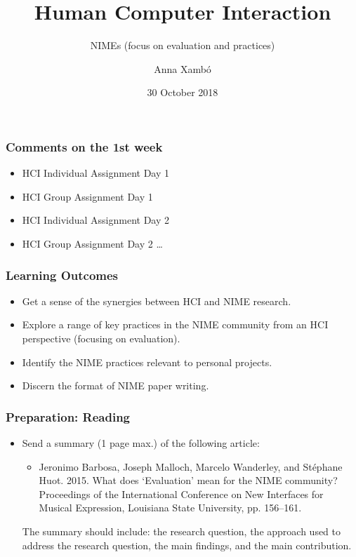 \documentclass[screen, aspectratio=169]{beamer}
\title[HCI-intro]{Human Computer Interaction}
\subtitle{NIMEs (focus on evaluation and practices)}
\author[A. Xamb{\'o}]{Anna Xamb{\'o}}
\institute[NTNU]{Department of Music, NTNU}
\date{30 October 2018}
\begin{document}
\begin{frame}
  \titlepage
\end{frame}

\begin{frame}
\frametitle{Comments on the 1st week}
\begin{itemize}
\item HCI Individual Assignment Day 1
\item HCI Group Assignment Day 1
\item HCI Individual Assignment Day 2
\item HCI Group Assignment Day 2 \dots
\end{itemize}
\end{frame}
%
\begin{frame}
\frametitle{Learning Outcomes}
\begin{itemize}
\item Get a sense of the synergies between HCI and NIME research.
\item Explore a range of key practices in the NIME community from an HCI perspective (focusing on evaluation).
\item Identify the NIME practices relevant to personal projects.
\item Discern the format of NIME paper writing.
\end{itemize}
\end{frame}
%
\begin{frame}
\frametitle{Preparation: Reading}
\begin{itemize}
\item Send a summary (1 page max.) of the following article:
\begin{itemize}
\item Jeronimo Barbosa, Joseph Malloch, Marcelo Wanderley, and St\'{e}phane Huot. 2015. What does `Evaluation' mean for the NIME community? Proceedings of the International Conference on New Interfaces for Musical Expression, Louisiana State University, pp. 156--161. \cite{Barbosa.et.al.2015.evaluationNIME}\\
\end{itemize}
The summary should include: the research question, the approach used to address the research question, the main findings, and the main contribution.
\end{itemize}
\end{frame}
\end{document}
